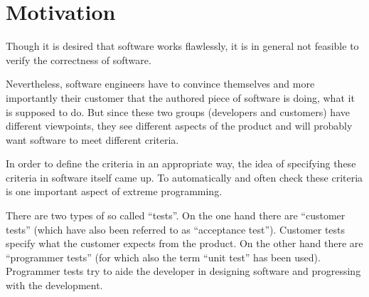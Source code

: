 %                                                                        
%                                                                        
%                                                                        
%                                                                        
%
\clearpage
\section{Motivation}

Though it is desired that software works flawlessly, it is in general not feasible to verify the correctness of software.

Nevertheless, software engineers have to convince themselves and more importantly their customer that the authored piece of software is doing, what it is supposed to do. But since these two groups (developers and customers) have different viewpoints, they see different aspects of the product and will probably want software to meet different criteria.

In order to define the criteria in an appropriate way, the idea of specifying these criteria in software itself came up\cite{Beck2003}. To automatically and often check these criteria is one important aspect of extreme programming\cite{Beck2000}.

There are two types of so called ``tests''. On the one hand there are ``customer tests'' (which have also been referred to as ``acceptance test''). Customer tests specify what the customer expects from the product. On the other hand there are ``programmer tests'' (for which also the term ``unit test'' has been used). Programmer tests try to aide the developer in designing software and progressing with the development.

